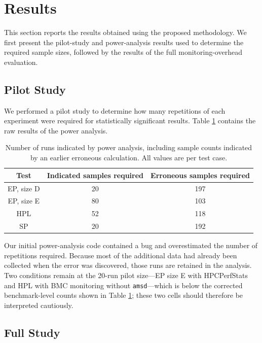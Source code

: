 \documentclass[conference]{IEEEtran}
\begin{document}
\section{Results} \label{results}
This section reports the results obtained using the proposed methodology. We first 
present the pilot-study and power-analysis results used to determine the required 
sample sizes, followed by the results of the full monitoring-overhead evaluation.

\subsection{Pilot Study}

We performed a pilot study to determine how many repetitions of each experiment 
were required for statistically significant results. Table \ref{table:power_analysis}
contains the raw results of the power analysis.

\begin{table}[h!]
\centering
\begin{tabular}{| c | c | c |} 
    \hline
    Test & Indicated samples required & Erroneous samples required \\ [0.5ex] 
    \hline
    EP, size D & 20 & 197\\ 
    \hline
    EP, size E & 80 & 103\\ 
    \hline
    HPL & 52 & 118 \\
    \hline
    SP & 20 & 192 \\
    \hline
\end{tabular}
\caption{Number of runs indicated by power analysis, including sample counts indicated by an earlier erroneous calculation. All values are per test case.}
\label{table:power_analysis}
\end{table}

Our initial power-analysis code contained a bug and overestimated the number of
repetitions required. Because most of the additional data had already been collected when
the error was discovered, those runs are retained in the analysis. Two conditions remain
at the 20-run pilot size---EP size E with HPCPerfStats and HPL with BMC monitoring without
\texttt{amsd}---which is below the corrected benchmark-level counts shown in
Table \ref{table:power_analysis}; these two cells should therefore be interpreted cautiously.


\subsection{Full Study}\label{full_results}
\end{document}
